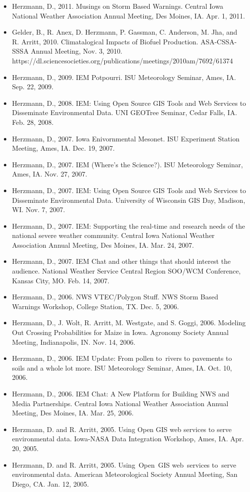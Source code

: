 \begin{itemize}
\item Herzmann, D., 2011. Musings on Storm Based Warnings. Central Iowa National Weather Association Annual Meeting, Des Moines, IA. Apr. 1, 2011.
\item Gelder, B., R. Anex, D. Herzmann, P. Gassman, C. Anderson, M. Jha, and R. Arritt, 2010. Climatalogical Impacts of Biofuel Production. ASA-CSSA-SSSA Annual Meeting, Nov. 3, 2010. https://dl.sciencesocieties.org/publications/meetings/2010am/7692/61374
\item Herzmann, D., 2009. IEM Potpourri. ISU Meteorology Seminar, Ames, IA. Sep. 22, 2009.
\item Herzmann, D., 2008. IEM: Using Open Source GIS Tools and Web Services to Disseminate Environmental Data. UNI GEOTree Seminar, Cedar Falls, IA. Feb. 28, 2008.
\item Herzmann, D., 2007. Iowa Enivornmental Mesonet. ISU Experiment Station Meeting, Ames, IA. Dec. 19, 2007.
\item Herzmann, D., 2007. IEM (Where's the Science?). ISU Meteorology Seminar, Ames, IA. Nov. 27, 2007.
\item Herzmann, D., 2007. IEM: Using Open Source GIS Tools and Web Services to Disseminate Environmental Data. University of Wisconsin GIS Day, Madison, WI. Nov. 7, 2007.
\item Herzmann, D., 2007. IEM: Supporting the real-time and research needs of the national severe weather community. Central Iowa National Weather Association Annual Meeting, Des Moines, IA. Mar. 24, 2007.
\item Herzmann, D., 2007. IEM Chat and other things that should interest the audience. National Weather Service Central Region SOO/WCM Conference, Kansas City, MO. Feb. 14, 2007.
\item Herzmann, D., 2006. NWS VTEC/Polygon Stuff. NWS Storm Based Warnings Workshop, College Station, TX. Dec. 5, 2006.
\item Herzmann, D., J. Wolt, R. Arritt, M. Westgate, and S. Goggi, 2006. Modeling Out Crossing Probabilities for Maize in Iowa. Agronomy Society Annual Meeting, Indianapolis, IN. Nov. 14, 2006.
\item Herzmann, D., 2006. IEM Update: From pollen to rivers to pavements to soils and a whole lot more. ISU Meteorology Seminar, Ames, IA. Oct. 10, 2006.
\item Herzmann, D., 2006. IEM Chat: A New Platform for Building NWS and Media Partnerships. Central Iowa National Weather Association Annual Meeting, Des Moines, IA. Mar. 25, 2006.
\item Herzmann, D. and R. Arritt, 2005. Using Open GIS web services to serve environmental data. Iowa-NASA Data Integration Workshop, Ames, IA. Apr. 20, 2005.
\item Herzmann, D. and R. Arritt, 2005. Using Open GIS web services to serve environmental data. American Meteorological Society Annual Meeting, San Diego, CA. Jan. 12, 2005.
\end{itemize}

